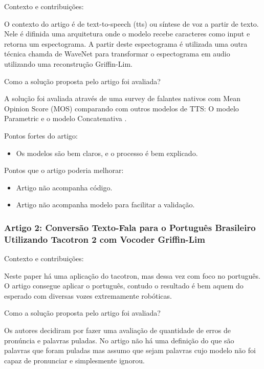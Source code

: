 \documentclass[a4paper,12pt]{article}
\begin{document}
			Contexto e contribuições:
						
			O contexto do artigo é de text-to-speech (tts) ou síntese de voz a partir de texto. Nele é difinida uma arquitetura onde o modelo recebe caracteres como input e retorna um espectograma. A partir deste espectograma é utilizada uma outra técnica chamda de WaveNet \cite{oord2016wavenet} para transformar o espectograma em audio utilizando uma reconstrução Griffin-Lim.
			
			Como a solução proposta pelo artigo foi avaliada?
			
			A solução foi avaliada através de uma survey de falantes nativos com Mean Opinion Score (MOS) comparando com outros modelos de TTS: O modelo Parametric \cite{zen2016parametric} e o modelo Concatenativa \cite{goncalvo2016concatenative}.
			
			Pontos fortes do artigo:
			\begin{itemize}
				\item Os modelos são bem claros, e o processo é bem explicado.
			\end{itemize}
			Pontos que o artigo poderia melhorar:
			\begin{itemize}
				\item Artigo não acompanha código.
				\item Artigo não acompanha modelo para facilitar a validação.
			\end{itemize}
			
			
			\subsubsection{Artigo 2: Conversão Texto-Fala para o Português Brasileiro Utilizando Tacotron 2 com Vocoder Griffin-Lim}
			
			Contexto e contribuições:
			
			Neste paper há uma aplicação do tacotron, mas dessa vez com foco no português. O artigo consegue aplicar o português, contudo o resultado é bem aquem do esperado com diversas vozes extremamente robóticas. \cite{rosa2021ttsptbr}

			Como a solução proposta pelo artigo foi avaliada?
			
			Os autores decidiram por fazer uma avaliação de quantidade de erros de pronúncia e palavras puladas. No artigo não há uma definição do que são palavras que foram puladas mas assumo que sejam palavras cujo modelo não foi capaz de pronunciar e simplesmente ignorou.
			
\end{document}
